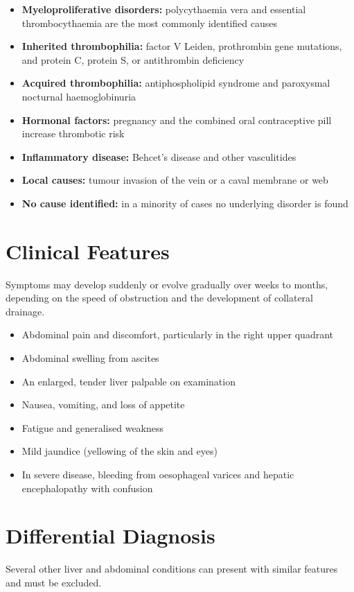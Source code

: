 \begin{itemize}
    \item \textbf{Myeloproliferative disorders:} polycythaemia vera and essential thrombocythaemia are the most commonly identified causes
    \item \textbf{Inherited thrombophilia:} factor V Leiden, prothrombin gene mutations, and protein C, protein S, or antithrombin deficiency
    \item \textbf{Acquired thrombophilia:} antiphospholipid syndrome and paroxysmal nocturnal haemoglobinuria
    \item \textbf{Hormonal factors:} pregnancy and the combined oral contraceptive pill increase thrombotic risk
    \item \textbf{Inflammatory disease:} Behcet's disease and other vasculitides
    \item \textbf{Local causes:} tumour invasion of the vein or a caval membrane or web
    \item \textbf{No cause identified:} in a minority of cases no underlying disorder is found
\end{itemize}

\section*{Clinical Features}
Symptoms may develop suddenly or evolve gradually over weeks to months, depending on the speed of obstruction and the development of collateral drainage.

\begin{itemize}
    \item Abdominal pain and discomfort, particularly in the right upper quadrant
    \item Abdominal swelling from ascites
    \item An enlarged, tender liver palpable on examination
    \item Nausea, vomiting, and loss of appetite
    \item Fatigue and generalised weakness
    \item Mild jaundice (yellowing of the skin and eyes)
    \item In severe disease, bleeding from oesophageal varices and hepatic encephalopathy with confusion
\end{itemize}

\section*{Differential Diagnosis}
Several other liver and abdominal conditions can present with similar features and must be excluded.

